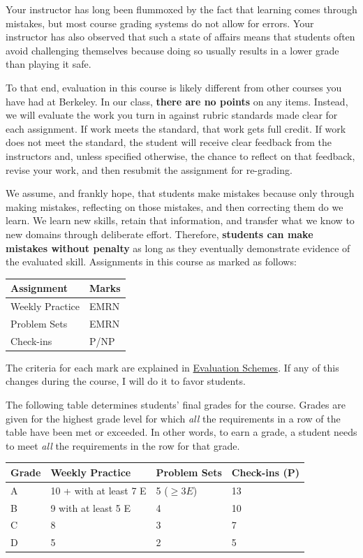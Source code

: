 \documentclass[
  11pt,
]{article}
\begin{document}
Your instructor has long been flummoxed by the fact that learning comes
through mistakes, but most course grading systems do not allow for
errors. Your instructor has also observed that such a state of affairs
means that students often avoid challenging themselves because doing so
usually results in a lower grade than playing it safe.

To that end, evaluation in this course is likely different from other
courses you have had at Berkeley. In our class, \textbf{there are no
points} on any items. Instead, we will evaluate the work you turn in
against rubric standards made clear for each assignment. If work meets
the standard, that work gets full credit. If work does not meet the
standard, the student will receive clear feedback from the instructors
and, unless specified otherwise, the chance to reflect on that feedback,
revise your work, and then resubmit the assignment for re-grading.

We assume, and frankly hope, that students make mistakes because only
through making mistakes, reflecting on those mistakes, and then
correcting them do we learn. We learn new skills, retain that
information, and transfer what we know to new domains through deliberate
effort. Therefore, \textbf{students can make mistakes without penalty}
as long as they eventually demonstrate evidence of the evaluated skill.
\newpage Assignments in this course as marked as follows:

\begin{longtable}[]{@{}ll@{}}
\toprule
Assignment & Marks \\
\midrule
\endhead
Weekly Practice & EMRN \\
Problem Sets & EMRN \\
Check-ins & P/NP \\
\bottomrule
\end{longtable}

The criteria for each mark are explained in
\protect\hyperlink{evaluation}{Evaluation Schemes}. If any of this
changes during the course, I will do it to favor students.

The following table determines students' final grades for the course.
Grades are given for the highest grade level for which \emph{all} the
requirements in a row of the table have been met or exceeded. In other
words, to earn a grade, a student needs to meet \emph{all} the
requirements in the row for that grade.

\begin{longtable}[]{@{}llll@{}}
\toprule
Grade & Weekly Practice & Problem Sets & Check-ins (P) \\
\midrule
\endhead
A & 10 + with at least 7 E & 5 (\(\geq 3 E\)) & 13 \\
B & 9 with at least 5 E & 4 & 10 \\
C & 8 & 3 & 7 \\
D & 5 & 2 & 5 \\
\bottomrule
\end{longtable}
\end{document}
